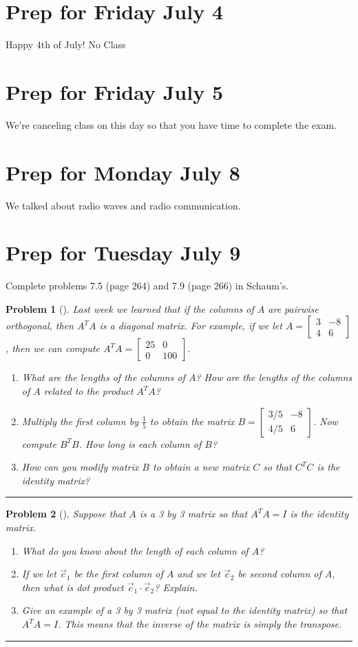 \documentclass[letterpaper,oneside]{book}%
\theoremstyle{plain}
\theoremstyle{box}
\theoremstyle{problem}
\newtheorem{problemnum}{Problem}[chapter]
\newtheorem*{hwenum*}{Home Work Practice}
\newenvironment{problem}[1][]{\begin{problemnum}[#1]}{\end{problemnum}\nopagebreak\hrule\bigskip}
\newenvironment{hw*}[1][]{\begin{hwenum*}[#1]}{\end{hwenum*}\nopagebreak\hrule\bigskip}
\newcommand{\bvec}[1]{\begin{bmatrix} #1 \end{bmatrix}}
\begin{document}
\section{Prep for Friday July 4}
Happy 4th of July! No Class
\section{Prep for Friday July 5}
We're canceling class on this day so that you have time to complete the exam.



\section{Prep for Monday July 8}

We talked about radio waves and radio communication.


\section{Prep for Tuesday July 9}

\begin{hw*}
 Complete problems 7.5 (page 264) and 7.9 (page 266) in Schaum's.
\end{hw*}


\begin{problem}
Last week we learned that if the columns of $A$ are pairwise orthogonal, then $A^TA$ is a diagonal matrix.  For example, if we let $A=\bvec{3&-8\\4&6}$, then we can compute $A^TA = \bvec{25&0\\ 0&100}.$ 
\begin{enumerate}
 \item What are the lengths of the columns of $A$?  How are the lengths of the columns of $A$ related to the product $A^TA$?
 \item Multiply the first column by $\frac{1}{5}$ to obtain the matrix $B=\bvec{3/5&-8\\4/5&6}$.  Now compute $B^TB$. How long is each column of $B$?
 \item How can you modify matrix $B$ to obtain a new matrix $C$ so that $C^TC$ is the identity matrix?  
\end{enumerate}
\end{problem}

\begin{problem}
 Suppose that $A$ is a 3 by 3 matrix so that $A^TA = I$ is the identity matrix. 
 \begin{enumerate}
  \item What do you know about the length of each column of $A$? 
  \item If we let $\vec c_1$ be the first column of $A$ and we let $\vec c_2$ be second column of $A$, then what is dot product $\vec c_1\cdot \vec c_2$? Explain.
  \item Give an example of a 3 by 3 matrix (not equal to the identity matrix) so that $A^TA=I$. This means that the inverse of the matrix is simply the transpose. 
 \end{enumerate}
\end{problem}
\end{document}
